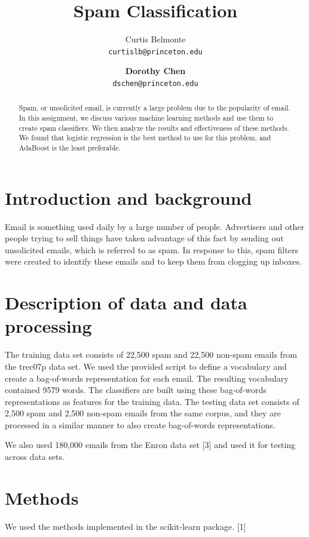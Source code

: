 \documentclass{article} %
\title{Spam Classification}
\author{Curtis Belmonte\\
{\tt\small curtislb@princeton.edu}
\and
\textbf{Dorothy Chen}\\
{\tt\small dschen@princeton.edu}
}
\begin{document}
\maketitle

\begin{abstract}
Spam, or unsolicited email, is currently a large problem due to the popularity of email. In this assignment, we discuss various machine learning methods and use them to create spam classifiers. We then analyze the results and effectiveness of these methods. We found that logistic regression is the best method to use for this problem, and AdaBoost is the least preferable. 
\end{abstract}

\section{Introduction and background}
Email is something used daily by a large number of people. Advertisers and other people trying to sell things have taken advantage of this fact by sending out unsolicited emails, which is referred to as spam. In response to this, spam filters were created to identify these emails and to keep them from clogging up inboxes.

\section{Description of data and data processing}
The training data set consists of 22,500 spam and 22,500 non-spam emails from the trec07p data set. We used the provided script to define a vocabulary and create a bag-of-words representation for each email. The resulting vocabulary contained 9579 words. The classifiers are built using these bag-of-words representations as features for the training data. The testing data set consists of 2,500 spam and 2,500 non-spam emails from the same corpus, and they are processed in a similar manner to also create bag-of-words representations. 

We also used 180,000 emails from the Enron data set [3] and used it for testing across data sets. 

\section{Methods}
We used the methods implemented in the scikit-learn package. [1]
\end{document}
